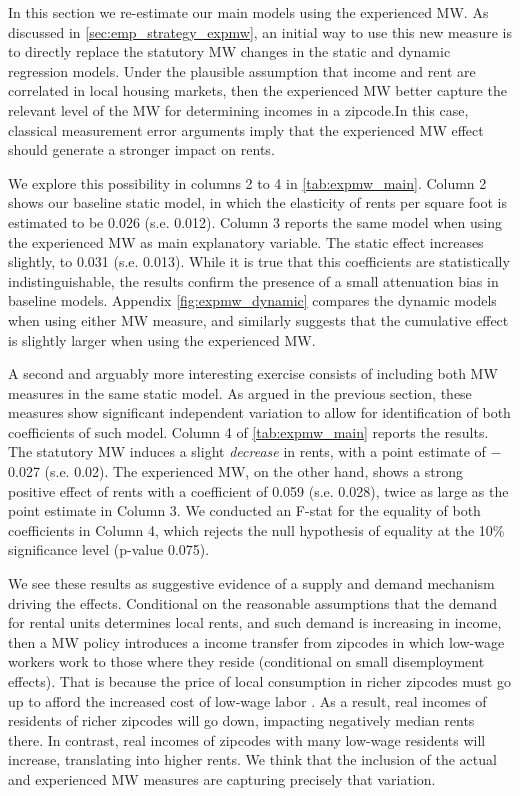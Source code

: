 In this section we re-estimate our main models using the experienced MW. As discussed in 
\autoref{sec:emp_strategy_expmw}, an initial way to use this new measure is to directly
replace the statutory MW changes in the static and dynamic regression models. 
Under the plausible assumption that income and rent are correlated in local 
housing markets, then the experienced MW better capture the relevant level of the 
MW for determining incomes in a zipcode.In this case, classical measurement error 
arguments imply that the experienced MW effect should generate a stronger impact on rents. 

We explore this possibility in columns 2 to 4 in \autoref{tab:expmw_main}. Column 2 
shows our baseline static model, in which the elasticity of rents per square foot is 
estimated to be 0.026 (s.e. 0.012). Column 3 reports the same model when using the 
experienced MW as main explanatory variable. The static effect increases slightly, to 0.031 (s.e. 0.013).
While it is true that this coefficients are statistically indistinguishable, the results
confirm the presence of a small attenuation bias in baseline models. 
Appendix \autoref{fig:expmw_dynamic} compares the dynamic models when using either MW 
measure, and similarly suggests that the cumulative effect is slightly larger when using
the experienced MW.

A second and arguably more interesting exercise consists of including both MW measures in
the same static model. As argued in the previous section, these measures show significant
independent variation to allow for identification of both coefficients of such model. 
Column 4 of \autoref{tab:expmw_main} reports the results. The statutory MW induces
a slight \textit{decrease} in rents, with a point estimate of $-$0.027 (s.e. 0.02). The 
experienced MW, on the other hand, shows a strong positive effect of rents with a 
coefficient of 0.059 (s.e. 0.028), twice as large as the point estimate in Column 3. We
conducted an F-stat for the equality of both coefficients in Column 4, which rejects the
null hypothesis of equality at the 10\% significance level (p-value 0.075). 

We see these results as suggestive evidence of a supply and demand mechanism driving the 
effects. Conditional on the reasonable assumptions that the demand for rental units determines 
local rents, and such demand is increasing in income, then a MW policy introduces a income transfer 
from zipcodes in which low-wage workers work to those where they reside (conditional on 
small disemployment effects). That is because the price of local consumption in richer zipcodes must go up 
to afford the increased cost of low-wage labor \parencite{allegretto2018local}. 
As a result, real incomes of residents of richer zipcodes will go down, impacting negatively median 
rents there. In contrast, real incomes
of zipcodes with many low-wage residents will increase, translating into higher rents. 
We think that the inclusion of the actual and experienced MW measures are capturing precisely
that variation.


